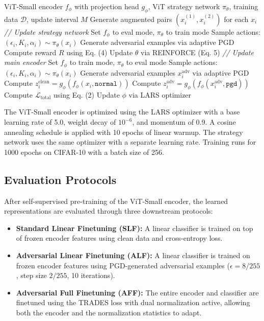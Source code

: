 \documentclass[conference]{IEEEtran}
\begin{document}
\begin{algorithm}
\caption{ASTrA Training Procedure}
\begin{algorithmic}[1]
\REQUIRE ViT-Small encoder $f_\phi$ with projection head $g_\phi$, ViT strategy network $\pi_\theta$, training data $\mathcal{D}$, update interval $M$
\STATE Generate augmented pairs $(x_i^{(1)}, x_i^{(2)})$ for each $x_i$
    \STATE \textit{// Update strategy network}
    \STATE Set $f_\phi$ to eval mode, $\pi_\theta$ to train mode
    \STATE Sample actions: $(\epsilon_i, K_i, \alpha_i) \sim \pi_\theta(x_i)$
    \STATE Generate adversarial examples via adaptive PGD
    \STATE Compute reward $R$ using Eq. (4)
    \STATE Update $\theta$ via REINFORCE (Eq. 5)
\ENDIF
\STATE \textit{// Update main encoder}
\STATE Set $f_\phi$ to train mode, $\pi_\theta$ to eval mode
\STATE Sample actions: $(\epsilon_i, K_i, \alpha_i) \sim \pi_\theta(x_i)$
\STATE Generate adversarial examples $x_i^{\text{adv}}$ via adaptive PGD
\STATE Compute $z_i^{\text{clean}} = g_\phi(f_\phi(x_i, \texttt{normal}))$
\STATE Compute $z_i^{\text{adv}} = g_\phi(f_\phi(x_i^{\text{adv}}, \texttt{pgd}))$
\STATE Compute $\mathcal{L}_{\text{total}}$ using Eq. (2)
\STATE Update $\phi$ via LARS optimizer
\ENDFOR
\ENDFOR
\end{algorithmic}
\end{algorithm}

The ViT-Small encoder is optimized using the LARS optimizer with a base learning rate of 5.0, weight decay of $10^{-6}$, and momentum of 0.9. A cosine annealing schedule is applied with 10 epochs of linear warmup. The strategy network uses the same optimizer with a separate learning rate. Training runs for 1000 epochs on CIFAR-10 with a batch size of 256.

\subsection{Evaluation Protocols}

After self-supervised pre-training of the ViT-Small encoder, the learned representations are evaluated through three downstream protocols:

\begin{itemize}
    \item \textbf{Standard Linear Finetuning (SLF):} A linear classifier is trained on top of frozen encoder features using clean data and cross-entropy loss.

    \item \textbf{Adversarial Linear Finetuning (ALF):} A linear classifier is trained on frozen encoder features using PGD-generated adversarial examples ($\epsilon = 8/255$, step size $2/255$, 10 iterations).

    \item \textbf{Adversarial Full Finetuning (AFF):} The entire encoder and classifier are finetuned using the TRADES loss with dual normalization active, allowing both the encoder and the normalization statistics to adapt.
\end{itemize}
\end{document}
